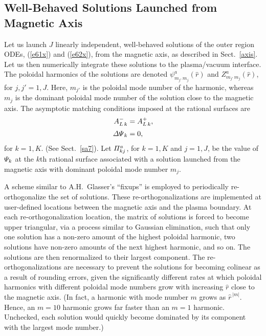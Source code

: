\documentclass[12pt,prb,aps]{revtex4-1}
\begin{document}
\subsection{Well-Behaved Solutions Launched from Magnetic Axis}
Let us launch $J$ linearly independent, well-behaved solutions of the outer region ODEs, (\ref{e61x}) and (\ref{e62x}), from the
magnetic axis, as described in Sect.~\ref{axis}. Let us then numerically integrate these solutions to the plasma/vacuum interface. The poloidal harmonics of
the solutions are denoted $\psi^a_{m_{j'}\,m_j}(\hat{r})$ and $Z^a_{m_{j'}\,m_j}(\hat{r})$, for $j,j'=1,J$. Here,
$m_{j'}$ is the poloidal mode number of the harmonic, whereas $m_j$ is the dominant poloidal mode number of the solution close to the
magnetic axis. The asymptotic matching conditions imposed at the rational surfaces are
\begin{align}
A_{L\,k}^{-} &= A_{L\,k}^+,\\[0.5ex]
{\mit\Delta\Psi}_k &= 0,
\end{align}
for $k=1,K$. (See Sect.~\ref{sa7}). 
Let ${\mit\Pi}_{kj}^a$, for   $k=1,K$ and $j=1,J$,  be the value of ${\mit\Psi}_k$ at the $k$th rational surface associated with a solution launched
from the magnetic axis with dominant poloidal mode number $m_j$. 

A scheme similar to A.H.~Glasser's ``fixups'' \cite{ham} is employed to periodically re-orthogonalize the set of solutions. These  re-orthogonalizations are implemented at user-defined locations between the magnetic axis and the plasma boundary.  At each re-orthogonalization location, the matrix of solutions is forced to become upper triangular, via a process similar to Gaussian elimination, such that only one solution has a non-zero amount of the highest poloidal  harmonic, two solutions have non-zero amounts of the next highest harmonic, and so on. The solutions are then renormalized to their largest component. 
 The re-orthogonalizations are
 necessary to prevent the solutions for becoming colinear as a result of rounding errors, given the significantly
 different rates at which poloidal harmonics with different poloidal mode numbers grow with increasing $\hat{r}$  close to the magnetic axis. (In fact, a
 harmonic with mode number $m$ grows as $\hat{r}^{\,|m|}$. Hence, an $m=10$ harmonic  grows far faster than an $m=1$ harmonic. Unchecked, each solution
 would quickly become dominated by its component with the largest mode number.)
\end{document}
